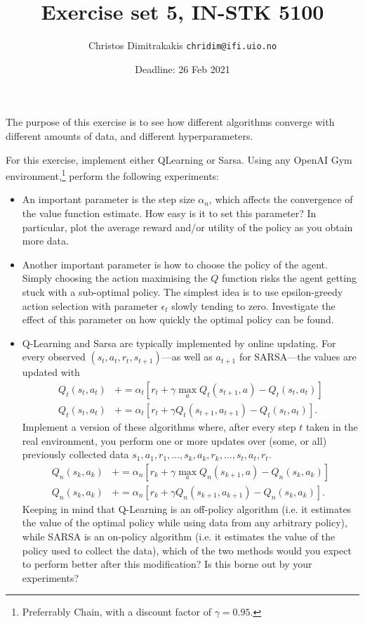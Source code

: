 \documentclass[twoside,a4paper]{article}
\begin{document}
\title{Exercise set 5, IN-STK 5100}
\author{Christos Dimitrakakis  \texttt{chridim@ifi.uio.no}}
\date{Deadline: 26 Feb 2021}
\maketitle

The purpose of this exercise is to see how different algorithms converge with different amounts of data, and different hyperparameters.

For this exercise, implement either QLearning or Sarsa. Using any OpenAI Gym environment,\footnote{Preferrably Chain, with a discount factor of $\gamma = 0.95$.} perform the following experiments:
\begin{itemize}
\item An important parameter is the step size  $\alpha_n$, which affects the convergence of the value function estimate. How easy is it to set this parameter? In particular, plot the average reward and/or utility of the policy as you obtain more data.
\item Another important parameter is how to choose the policy of the agent. Simply choosing the action maximising the $Q$ function risks the agent getting stuck with a sub-optimal policy. The simplest idea is to use epsilon-greedy action selection  with parameter $\epsilon_t$ slowly tending to zero. Investigate the effect of this parameter on how quickly the optimal policy can be found.
\item Q-Learning and Sarsa are typically implemented by online updating. For every observed $(s_t,a_t, r_t, s_{t+1})$---as well as $a_{t+1}$ for SARSA---the values are updated with
  \begin{align}
    Q_t(s_t, a_t) &+=  \alpha_t [r_t + \gamma \max_a Q_t(s_{t+1}, a) -  Q_t(s_t, a_t)] \tag{Q-Learning}\\
    Q_t(s_t, a_t) &+=  \alpha_t [r_t + \gamma Q_t(s_{t+1}, a_{t+1}) -  Q_t(s_t, a_t)] \tag{SARSA}.
  \end{align}
  Implement a version of these algorithms where, after every step $t$ taken in the real environment, you perform one or more updates over (some, or all) previously collected data $s_1, a_1, r_1, \ldots, s_k, a_k, r_k, \ldots, s_t, a_t, r_t$.
  \begin{align}
    Q_n(s_k, a_k) &+=  \alpha_n [r_k + \gamma \max_a Q_n(s_{k+1}, a) -  Q_n(s_k, a_k)] \tag{Q-Learning}\\
    Q_n(s_k, a_k) &+=  \alpha_n [r_k + \gamma Q_n(s_{k+1}, a_{k+1}) -  Q_n(s_k, a_k)] \tag{SARSA}.
  \end{align}
  Keeping in mind that Q-Learning is an off-policy algorithm (i.e. it estimates the value of the optimal policy while using data from any arbitrary policy), while SARSA is an on-policy algorithm (i.e. it estimates the value of the policy used to collect the data), which of the two methods would you expect to perform better after this modification? Is this borne out by your experiments?
\end{itemize}
\end{document}
